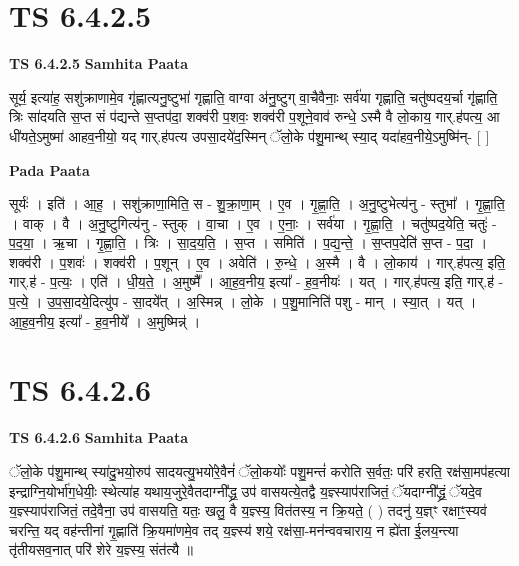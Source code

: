 \documentclass[17pt]{extarticle}
\begin{document}
\section{ TS 6.4.2.5 }

\textbf{TS 6.4.2.5 } \newline
\textbf{Samhita Paata} \newline

सूर्य॒ इत्या॑ह॒ सशु॑क्राणामे॒व गृ॑ह्णात्यनु॒ष्टुभा॑ गृह्णाति॒ वाग्वा अ॑नु॒ष्टुग् वा॒चैवैनाः॒ सर्व॑या गृह्णाति॒ चतु॑ष्पदय॒र्चा गृ॑ह्णाति॒ त्रिः सा॑दयति स॒प्त सं प॑द्यन्ते स॒प्तप॑दा॒ शक्व॑री प॒शवः॒ शक्व॑री प॒शूने॒वाव॑ रुन्धे॒ ऽस्मै वै लो॒काय॒ गार्.ह॑पत्य॒ आ धी॑यते॒ऽमुष्मा॑ आहव॒नीयो॒ यद् गार्.ह॑पत्य उपसा॒दये॑द॒स्मिन् ॅलो॒के प॑शु॒मान्थ् स्या॒द् यदा॑हव॒नीये॒ऽमुष्मि॑न्- [  ] \newline

\textbf{Pada Paata} \newline

सूर्यः॑ । इति॑ । आ॒ह॒ । सशु॑क्राणा॒मिति॒ स - शु॒क्रा॒णा॒म् । ए॒व । गृ॒ह्णा॒ति॒ । अ॒नु॒ष्टुभेत्य॑नु - स्तुभा᳚ । गृ॒ह्णा॒ति॒ । वाक् । वै । अ॒नु॒ष्टुगित्य॑नु - स्तुक् । वा॒चा । ए॒व । ए॒नाः॒ । सर्व॑या । गृ॒ह्णा॒ति॒ । चतु॑ष्पद॒येति॒ चतुः॑ - प॒द॒या॒ । ऋ॒चा । गृ॒ह्णा॒ति॒ । त्रिः । सा॒द॒य॒ति॒ । स॒प्त । समिति॑ । प॒द्य॒न्ते॒ । स॒प्तप॒देति॑ स॒प्त - प॒दा॒ । शक्व॑री । प॒शवः॑ । शक्व॑री । प॒शून् । ए॒व । अवेति॑ । रु॒न्धे॒ । अ॒स्मै । वै । लो॒काय॑ । गार्.ह॑पत्य॒ इति॒ गार्.ह॑ - प॒त्यः॒ । एति॑ । धी॒य॒ते॒ । अ॒मुष्मै᳚ । आ॒ह॒व॒नीय॒ इत्या᳚ - ह॒व॒नीयः॑ । यत् । गार्.ह॑पत्य॒ इति॒ गार्.ह॑ - प॒त्ये॒ । उ॒प॒सा॒दये॒दित्यु॑प - सा॒दये᳚त् । अ॒स्मिन्न् । लो॒के । प॒शु॒मानिति॑ पशु - मान् । स्या॒त् । यत् । आ॒ह॒व॒नीय॒ इत्या᳚ - ह॒व॒नीये᳚ । अ॒मुष्मिन्न्॑ ।  \newline





\section{ TS 6.4.2.6 }

\textbf{TS 6.4.2.6 } \newline
\textbf{Samhita Paata} \newline

ॅलो॒के प॑शु॒मान्थ् स्या॑दु॒भयो॒रुप॑ सादयत्यु॒भयो॑रे॒वैनं॑ ॅलो॒कयोः᳚ पशु॒मन्तं॑ करोति स॒र्वतः॒ परि॑ हरति॒ रक्ष॑सा॒मप॑हत्या इन्द्राग्नि॒योर्भा॑ग॒धेयीः॒ स्थेत्या॑ह यथाय॒जुरे॒वैतदाग्नी᳚द्ध्र॒ उप॑ वासयत्ये॒तद्वै य॒ज्ञ्स्याप॑राजितं॒ ॅयदाग्नी᳚द्ध्रं॒ ॅयदे॒व य॒ज्ञ्स्याप॑राजितं॒ तदे॒वैना॒ उप॑ वासयति॒ यतः॒ खलु॒ वै य॒ज्ञ्स्य॒ वित॑तस्य॒ न क्रि॒यते॒ ( ) तदनु॑ य॒ज्ञ्ꣳ रक्षाꣳ॒॒स्यव॑ चरन्ति॒ यद् वह॑न्तीनां गृ॒ह्णाति॑ क्रि॒यमा॑णमे॒व तद् य॒ज्ञ्स्य॑ शये॒ रक्ष॑सा॒-मन॑न्ववचाराय॒ न ह्ये॑ता ई॒लय॒न्त्या तृ॑तीयसव॒नात् परि॑ शेरे य॒ज्ञ्स्य॒ संत॑त्यै ॥ \newline
\end{document}
